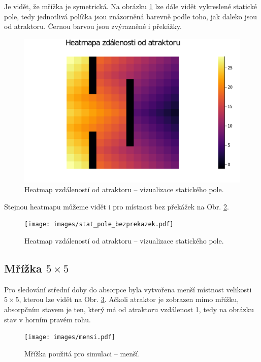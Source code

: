 \documentclass[a4paper, 12pt, fleqn]{article}
\begin{document}
	Je vidět, že mřížka je symetrická. Na obrázku \ref{Obr: Statické pole} lze dále vidět vykreslené statické pole, tedy jednotlivá políčka jsou znázorněná barevně podle toho, jak daleko jsou od atraktoru. Černou barvou jsou zvýrazněné i překážky.
	
	\begin{figure}
		\centering
		\includegraphics[width=\linewidth]{images/stat_pole.pdf}
		\caption{Heatmap vzdáleností od atraktoru -- vizualizace statického pole.}
		\label{Obr: Statické pole}
	\end{figure}
	
	Stejnou heatmapu můžeme vidět i pro místnost bez překážek na Obr. \ref{Obr: Statické pole bez překážek}.
	
	\begin{figure}
		\centering
		\texttt{[image: images/stat\_pole\_bezprekazek.pdf]}
		\caption{Heatmap vzdáleností od atraktoru -- vizualizace statického pole.}
		\label{Obr: Statické pole bez překážek}
	\end{figure}
	\pagebreak
	\subsection{Mřížka $5 \times 5$}
	
	Pro sledování střední doby do absorpce byla vytvořena menší místnost velikosti $5 \times 5$, kterou lze vidět na Obr. \ref{Obr: Menší}. Ačkoli atraktor je zobrazen mimo mřížku, absorpčním stavem je ten, který má od atraktoru vzdálenost 1, tedy na obrázku stav v horním pravém rohu.
	
	\begin{figure}[h]
		\centering
		\texttt{[image: images/mensi.pdf]}
		\caption{Mřížka použitá pro simulaci -- menší.}
		\label{Obr: Menší}
	\end{figure}
	
\end{document}

